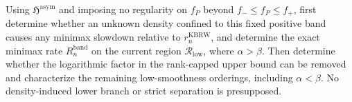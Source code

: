 Using \(\mathfrak{H}^{\mathrm{asym}}\) and imposing no regularity on \(f_P\) beyond \(f_{-}\le f_P\le f_{+}\), first determine whether an unknown density confined to this fixed positive band causes any minimax slowdown relative to \(r_n^{\mathrm{KBRW}}\), and determine the exact minimax rate \(R_n^{\mathrm{band}}\) on the current region \(\mathcal R_{\mathrm{low}}\), where \(\alpha>\beta\).  Then determine whether the logarithmic factor in the rank-capped upper bound can be removed and characterize the remaining low-smoothness orderings, including \(\alpha<\beta\).  No density-induced lower branch or strict separation is presupposed.